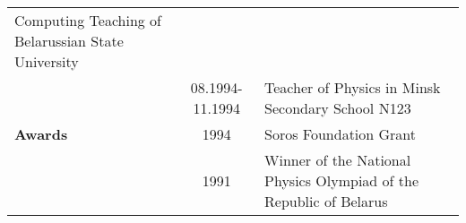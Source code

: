 \documentclass[12pt,twoside,a4paper]{report}
\begin{document}
{\begin{tabular}{|l||cp{10cm}|}
                                                                            Computing Teaching  of Belarussian State University\\
                                                  & 08.1994-11.1994 & Teacher of Physics in Minsk Secondary School N123            \\ \hline
                      {\bf Awards}                & 1994                  & Soros Foundation Grant                                       \\
                                                  & 1991                  & Winner of the National Physics Olympiad of the Republic of Belarus\\ \hline

\end{tabular}}
\end{document}
